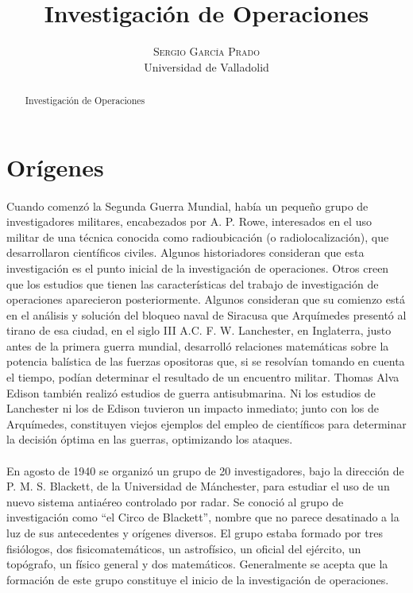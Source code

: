 \documentclass[10pt, a4paper,spanish]{article}
\title{\vspace{-15mm}\fontsize{24pt}{10pt}\selectfont\textbf{Investigación de Operaciones}} %
\author{
\large
\textsc{Sergio García Prado}\\[2mm] %
\normalsize Universidad de Valladolid \\ %
\vspace{-5mm}
}
\date{}
\begin{document}
	\maketitle %

	\thispagestyle{fancy} %


	\begin{abstract}
		\noindent Investigación de Operaciones 
	\end{abstract}

	\section{Orígenes}
	
		\paragraph{}
		Cuando comenzó la Segunda Guerra Mundial, había un pequeño grupo de investigadores militares, encabezados por A. P. Rowe, interesados en el uso militar de una técnica conocida como radioubicación (o radiolocalización), que desarrollaron científicos civiles. Algunos historiadores consideran que esta investigación es el punto inicial de la investigación de operaciones. Otros creen que los estudios que tienen las características del trabajo de investigación de operaciones aparecieron posteriormente. Algunos consideran que su comienzo está en el análisis y solución del bloqueo naval de Siracusa que Arquímedes presentó al tirano de esa ciudad, en el siglo III A.C. F. W. Lanchester, en Inglaterra, justo antes de la primera guerra mundial, desarrolló relaciones matemáticas sobre la potencia balística de las fuerzas opositoras que, si se resolvían tomando en cuenta el tiempo, podían determinar el resultado de un encuentro militar. Thomas Alva Edison también realizó estudios de guerra antisubmarina. Ni los estudios de Lanchester ni los de Edison tuvieron un impacto inmediato; junto con los de Arquímedes, constituyen viejos ejemplos del empleo de científicos para determinar la decisión óptima en las guerras, optimizando los ataques. \cite{wikipedia_IO}
		
		\paragraph{}
		En agosto de 1940 se organizó un grupo de 20 investigadores, bajo la dirección de P. M. S. Blackett, de la Universidad de Mánchester, para estudiar el uso de un nuevo sistema antiaéreo controlado por radar. Se conoció al grupo de investigación como “el Circo de Blackett”, nombre que no parece desatinado a la luz de sus antecedentes y orígenes diversos. El grupo estaba formado por tres fisiólogos, dos fisicomatemáticos, un astrofísico, un oficial del ejército, un topógrafo, un físico general y dos matemáticos. Generalmente se acepta que la formación de este grupo constituye el inicio de la investigación de operaciones. \cite{wikipedia_IO}
	
\end{document}
